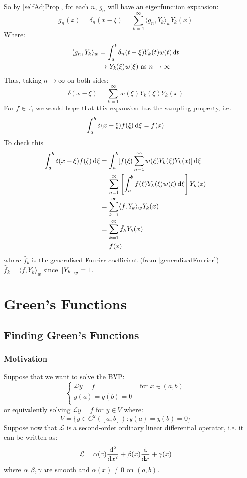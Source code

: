 \documentclass[../main.tex]{subfiles}
\begin{document}
So by \cref{selfAdjProp}, for each $n$, $g_n$ will have an eigenfunction expansion:
\[
  g_n(x) = \delta_n(x - \xi) = \sum_{k = 1}^{\infty} \langle g_n, Y_k \rangle_w Y_k(x)
\]
Where:
\begin{align*}
  \langle g_n, Y_k \rangle_w &= \int_{a}^{b} \delta_n(t - \xi)Y_k(t) w(t)\d{t} \\
                           &\to Y_k(\xi) w(\xi) \text{ as $n \to \infty$}
\end{align*}
Thus, taking $n \to \infty$ on both sides:
\[
  \delta(x - \xi) = \sum_{k = 1}^{\infty} w(\xi)Y_k(\xi)Y_k(x)
\]
For $f \in V$, we would hope that this expansion has the sampling property, i.e.:
\[
  \int_{a}^{b} \delta(x - \xi) f(\xi) \d{\xi} = f(x)
\]
To check this:
\begin{align*}
  \int_{a}^{b} \delta(x - \xi) f(\xi) \d{\xi} &= \int_{a}^{b} [f(\xi) \sum_{n = 1}^{\infty} w(\xi) Y_k(\xi) Y_k(x)] \d{\xi} \\
                                              &= \sum_{n = 1}^{\infty} \left[\int_{a}^{b} f(\xi)Y_k(\xi)w(\xi) \d{\xi}\right] Y_k(x) \\
                                              &= \sum_{k = 1}^{\infty} \langle f,Y_k \rangle_w Y_k(x) \\
                                              &= \sum_{k = 1}^{\infty} \hat{f}_k Y_k(x) \\
                                              &= f(x)
\end{align*}
where $\hat{f}_k$ is the generalised Fourier coefficient (from \cref{generalisedFourier}) $\hat{f}_k = \langle f, Y_k \rangle_{w}$ since $\left\lVert Y_k \right\rVert_w = 1$.
\section{Green's Functions}
\subsection{Finding Green's Functions} \label{findingGreens}
\subsubsection{Motivation}
Suppose that we want to solve the BVP:
\begin{equation}
  \label{genLP}
  \begin{cases}
  \mathcal{L}y = f & \text{ for } x \in (a, b) \\
  y(a) = y(b) = 0 &  \\
  \end{cases}
\end{equation}
or equivalently solving $\mathcal{L} y = f$ for $y \in V$ where:
\[
  V = \{y \in C^2([a, b]): y(a) = y(b) = 0\}
\]
Suppose now that $\mathcal{L}$ is a second-order ordinary linear differential operator, i.e. it can be written as:
\begin{equation}
  \mathcal{L} = \alpha(x) \deriv[2]{}{x} + \beta(x) \deriv{}{x} + \gamma(x) \label{genSOL}
\end{equation}
where $\alpha, \beta, \gamma$ are smooth and $\alpha(x) \neq 0$ on $(a, b)$.
\end{document}
